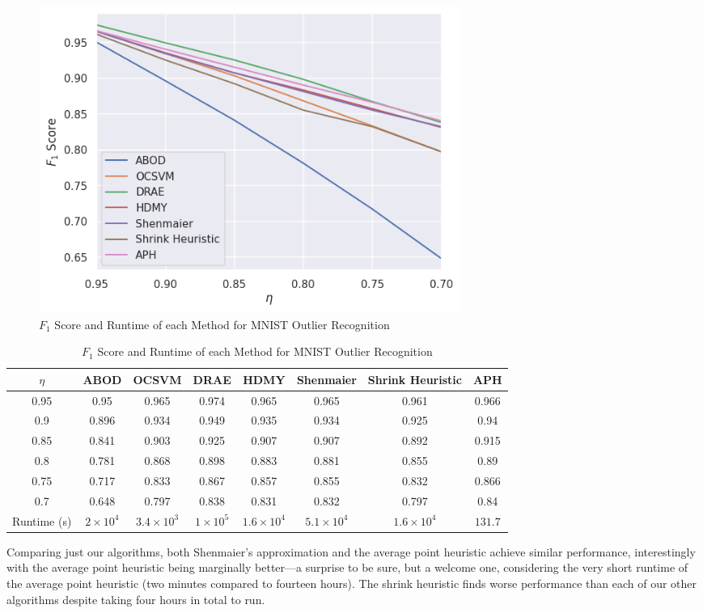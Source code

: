 \documentclass[11pt,twoside]{report}
\theoremstyle{definition}
\numberwithin{theorem}{section}
\numberwithin{definition}{section}
\numberwithin{lemma}{section}
\numberwithin{proposition}{section}
\numberwithin{equation}{section}
\numberwithin{figure}{section}
\begin{document}
\begin{figure}[ht]
    \centering
    \includegraphics[width=0.6666\textwidth]{images/mnist_plot.png}
    \caption{$F_1$ Score and Runtime of each Method for MNIST Outlier Recognition}
    \label{fig:mnist_fig}
\end{figure}
\begin{table}[ht]
    \centering
    \begin{tabular}{|c||c|c|c|c||c|c|c|} \hline
        $\eta$&ABOD&OCSVM&DRAE&HDMY&Shenmaier&Shrink Heuristic&APH \\ \hline
        0.95&0.95&0.965&0.974&0.965&0.965&0.961&0.966 \\
        0.9&0.896&0.934&0.949&0.935&0.934&0.925&0.94 \\
        0.85&0.841&0.903&0.925&0.907&0.907&0.892&0.915 \\
        0.8&0.781&0.868&0.898&0.883&0.881&0.855&0.89 \\
        0.75&0.717&0.833&0.867&0.857&0.855&0.832&0.866 \\
        0.7&0.648&0.797&0.838&0.831&0.832&0.797&0.84 \\ \hline
        Runtime (s) & $2\times10^4$ & $3.4\times10^3$ & $1\times10^5$ & $1.6\times10^4$ & $5.1\times10^4$ & $1.6\times10^4$ & $131.7$ \\ \hline
    \end{tabular}
    \caption{$F_1$ Score and Runtime of each Method for MNIST Outlier Recognition}
    \label{tab:mnist_table}
\end{table}

Comparing just our algorithms, both Shenmaier's approximation and the average point heuristic achieve similar performance, interestingly with the average point heuristic being marginally better---a surprise to be sure, but a welcome one, considering the very short runtime of the average point heuristic (two minutes compared to fourteen hours). The shrink heuristic finds worse performance than each of our other algorithms despite taking four hours in total to run.
\end{document}
